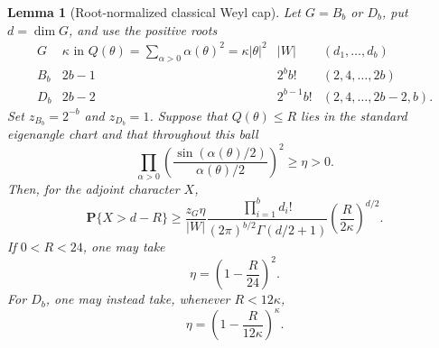 \documentclass[11pt,reqno]{amsart}
\theoremstyle{plain}
\newtheorem{lemma}[theorem]{Lemma}
\theoremstyle{definition}
\begin{document}
\begin{lemma}[Root-normalized classical Weyl cap]
\label{lem:full-q3-classical-weyl-cap}
Let $G=B_b$ or $D_b$, put $d=\dim G$, and use the positive roots
\[
 \begin{array}{c|c|c|c}
 G&\kappa\text{ in }Q(\theta)=\sum_{\alpha>0}\alpha(\theta)^2
   =\kappa|\theta|^2&|W|&(d_1,\ldots,d_b)\\ \hline
 B_b&2b-1&2^bb!&(2,4,\ldots,2b)\\
 D_b&2b-2&2^{b-1}b!&(2,4,\ldots,2b-2,b).
 \end{array}
\]
Set $z_{B_b}=2^{-b}$ and $z_{D_b}=1$.  Suppose that $Q(\theta)\leq R$
lies in the standard eigenangle chart and that throughout this ball
\[
 \prod_{\alpha>0}
 \left(\frac{\sin(\alpha(\theta)/2)}{\alpha(\theta)/2}\right)^2
 \geq\eta>0.
\]
Then, for the adjoint character $X$,
\begin{equation}
\label{eq:full-q3-classical-cap-mass}
 \mathbf P\{X>d-R\}\geq
 \frac{z_G\eta}{|W|}
 \frac{\prod_{i=1}^b d_i!}
 {(2\pi)^{b/2}\Gamma(d/2+1)}
 \left(\frac{R}{2\kappa}\right)^{d/2}.
\end{equation}
If $0<R<24$, one may take
\begin{equation}
\label{eq:full-q3-product-sine-small}
 \eta=\left(1-\frac R{24}\right)^2.
\end{equation}
For $D_b$, one may instead take, whenever $R<12\kappa$,
\begin{equation}
\label{eq:full-q3-product-sine-long}
 \eta=\left(1-\frac{R}{12\kappa}\right)^\kappa.
\end{equation}
\end{lemma}
\end{document}
